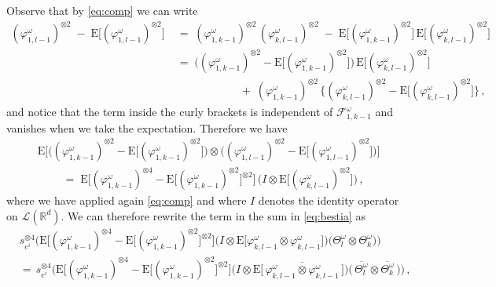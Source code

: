 \documentclass[a4paper,reqno,11pt]{amsart}
\numberwithin{equation}{section}
\newcommand{\cF}{{\ensuremath{\mathcal F}} }
\newcommand{\cL}{{\ensuremath{\mathcal L}} }
\newcommand{\go}{\omega}
\newcommand{\R}{\mathbb{R}}
\def\bE{\ensuremath{\bs{\mathrm{E}}}}
\def\bs{\boldsymbol}
\renewcommand{\phi}{\varphi}
\begin{document}
Observe that by \eqref{eq:comp} we can write
\begin{equation}
\begin{split}
	(\phi_{1,l-1}^\go)^{\otimes 2} \;-\; \bE\big[ (\phi_{1,l-1}^\go)^{\otimes 2} \big]
	& \;=\; (\phi_{1,k-1}^\go)^{\otimes 2} \, (\phi_{k, l-1}^\go)^{\otimes 2}
	\;-\; \bE\big[ (\phi_{1,k-1}^\go)^{\otimes 2} \big] \,
	\bE\big[ (\phi_{k,l-1}^\go)^{\otimes 2} \big]\\
	& \;=\; \Big( (\phi_{1,k-1}^\go)^{\otimes 2}
	- \bE\big[ (\phi_{1,k-1}^\go)^{\otimes 2} \big] \Big) \,
	\bE\big[ (\phi_{k,l-1}^\go)^{\otimes 2} \big] \\
	& \qquad \qquad \qquad + \; (\phi_{1,k-1}^\go)^{\otimes 2} \,
	\Big\{ (\phi_{k, l-1}^\go)^{\otimes 2} - \bE\big[ (\phi_{k,l-1}^\go)^{\otimes 2} \big] \Big\} \,,
\end{split}
\end{equation}
and notice that the term inside the curly brackets is independent
of $\cF^\go_{1,k-1}$ and vanishes when we take
the expectation. Therefore we have
\begin{equation}
\begin{split}
	& \bE \Big[
	\big( (\phi_{1,k-1}^\go)^{\otimes 2} - \bE \big[ (\phi_{1,k-1}^\go)^{\otimes 2} \big]
	\big) \otimes \big( (\phi_{1,l-1}^\go)^{\otimes 2} - \bE\big[ (\phi_{1,l-1}^\go)^{\otimes 2}
	\big] \big) \Big] \\
	& \qquad \;=\;
	\bE \Big[(\phi_{1,k-1}^\go)^{\otimes 4} -
	\bE \big[ (\phi_{1,k-1}^\go)^{\otimes 2} \big] ^{\otimes 2} \Big] \,
	\big( I \otimes \bE\big[ (\phi_{k,l-1}^\go)^{\otimes 2} \big] \big) \,,
\end{split}
\end{equation}
where we have applied again \eqref{eq:comp} and where $I$ denotes the
identity operator on $\cL(\R^d)$. We can therefore rewrite
the term in the sum in \eqref{eq:bestia} as
\begin{equation} \label{eq:combine}
\begin{split}
	& s_{e^i}^{\otimes 4} 	\Big(
	\bE \Big[(\phi_{1,k-1}^\go)^{\otimes 4} -
	\bE \big[ (\phi_{1,k-1}^\go)^{\otimes 2} \big]^{\otimes 2} \Big]
	\big( I \otimes \bE\big[ \phi_{k,l-1}^\go \otimes \phi_{k,l-1}^\go \big] \big)
	\big( \Theta^\go_l \otimes \Theta^\go_k \big) \Big) \\
	& =\, s_{e^i}^{\otimes 4} 	\Big(
	\bE \Big[(\phi_{1,k-1}^\go)^{\otimes 4} -
	\bE \big[ (\phi_{1,k-1}^\go)^{\otimes 2} \big]^{\otimes 2} \Big]
	\big( I \otimes \bE\big[\, \overline{\phi_{k,l-1}^\go \otimes \phi_{k,l-1}^\go} \, \big] \big)
	\big(\, \overline{\Theta^\go_l} \otimes \overline{\Theta^\go_k}\, \big) \Big) \,,
\end{split}
\end{equation}
\end{document}
